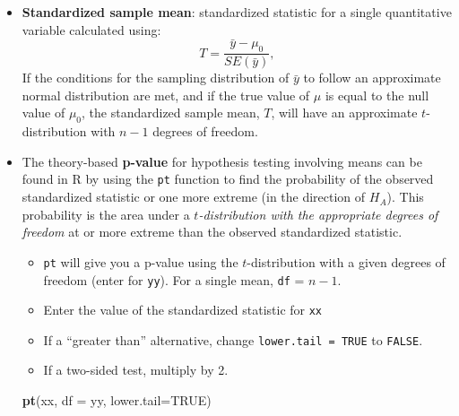 \documentclass[
]{report}
\newenvironment{Shaded}{\begin{snugshade}}{\end{snugshade}}
\newcommand{\AttributeTok}[1]{\textcolor[rgb]{0.13,0.29,0.53}{#1}}
\newcommand{\ConstantTok}[1]{\textcolor[rgb]{0.56,0.35,0.01}{#1}}
\newcommand{\FunctionTok}[1]{\textcolor[rgb]{0.13,0.29,0.53}{\textbf{#1}}}
\newcommand{\NormalTok}[1]{#1}
\providecommand{\tightlist}{%
  \setlength{\itemsep}{0pt}\setlength{\parskip}{0pt}}
\begin{document}
\begin{itemize}
  \begin{itemize}
  \tightlist
  \item
    For inference involving means, the formula for the standard error will be the same for both hypothesis tests and confidence intervals (unlike inference involving proportions, where the standard error for a hypothesis test used the null value in the calculation).
  \end{itemize}
\item
  \textbf{Standardized sample mean}: standardized statistic for a single quantitative variable calculated using:
  \[
  T = \frac{\bar{y} - \mu_0}{SE(\bar{y})},
  \]
  If the conditions for the sampling distribution of \(\bar{y}\) to follow an approximate normal distribution are met, and if the true value of \(\mu\) is equal to the null value of \(\mu_0\), the standardized sample mean, \(T\), will have an approximate \(t\)-distribution with \(n-1\) degrees of freedom.
\item
  The theory-based \textbf{p-value} for hypothesis testing involving means can be found in R by using the \texttt{pt} function to find the probability of the observed standardized statistic or one more extreme (in the direction of \(H_A\)). This probability is the area under a \emph{\(t\)-distribution with the appropriate degrees of freedom} at or more extreme than the observed standardized statistic.

  \begin{itemize}
  \item
    \texttt{pt} will give you a p-value using the \(t\)-distribution with a given degrees of freedom (enter for \texttt{yy}). For a single mean, \texttt{df} = \(n - 1\).
  \item
    Enter the value of the standardized statistic for \texttt{xx}
  \item
    If a ``greater than'' alternative, change \texttt{lower.tail\ =\ TRUE} to \texttt{FALSE}.
  \item
    If a two-sided test, multiply by 2.
  \end{itemize}

\begin{Shaded}
\begin{Highlighting}[]
\FunctionTok{pt}\NormalTok{(xx, }\AttributeTok{df =}\NormalTok{ yy, }\AttributeTok{lower.tail=}\ConstantTok{TRUE}\NormalTok{)}
\end{Highlighting}
\end{Shaded}
\end{itemize}
\end{document}
